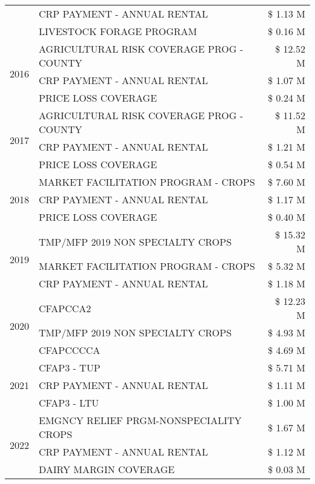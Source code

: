 \begin{tabular}{llr}
 & CRP PAYMENT - ANNUAL RENTAL & \$ 1.13 M \\
 & LIVESTOCK FORAGE PROGRAM & \$ 0.16 M \\
\cline{1-3}
\multirow[t]{3}{*}{2016} & AGRICULTURAL RISK COVERAGE PROG - COUNTY & \$ 12.52 M \\
 & CRP PAYMENT - ANNUAL RENTAL & \$ 1.07 M \\
 & PRICE LOSS COVERAGE & \$ 0.24 M \\
\cline{1-3}
\multirow[t]{3}{*}{2017} & AGRICULTURAL RISK COVERAGE PROG - COUNTY & \$ 11.52 M \\
 & CRP PAYMENT - ANNUAL RENTAL & \$ 1.21 M \\
 & PRICE LOSS COVERAGE & \$ 0.54 M \\
\cline{1-3}
\multirow[t]{3}{*}{2018} & MARKET FACILITATION PROGRAM - CROPS & \$ 7.60 M \\
 & CRP PAYMENT - ANNUAL RENTAL & \$ 1.17 M \\
 & PRICE LOSS COVERAGE & \$ 0.40 M \\
\cline{1-3}
\multirow[t]{3}{*}{2019} & TMP/MFP 2019 NON SPECIALTY CROPS & \$ 15.32 M \\
 & MARKET FACILITATION PROGRAM - CROPS & \$ 5.32 M \\
 & CRP PAYMENT - ANNUAL RENTAL & \$ 1.18 M \\
\cline{1-3}
\multirow[t]{3}{*}{2020} & CFAPCCA2 & \$ 12.23 M \\
 & TMP/MFP 2019 NON SPECIALTY CROPS & \$ 4.93 M \\
 & CFAPCCCCA & \$ 4.69 M \\
\cline{1-3}
\multirow[t]{3}{*}{2021} & CFAP3 - TUP & \$ 5.71 M \\
 & CRP PAYMENT - ANNUAL RENTAL & \$ 1.11 M \\
 & CFAP3 - LTU & \$ 1.00 M \\
\cline{1-3}
\multirow[t]{3}{*}{2022} & EMGNCY RELIEF PRGM-NONSPECIALITY CROPS & \$ 1.67 M \\
 & CRP PAYMENT - ANNUAL RENTAL & \$ 1.12 M \\
 & DAIRY MARGIN COVERAGE & \$ 0.03 M \\
\cline{1-3}
\bottomrule
\end{tabular}
